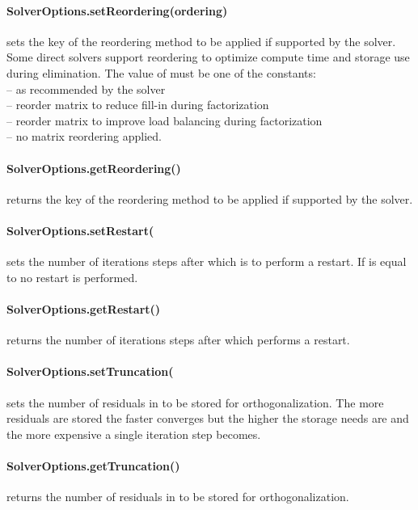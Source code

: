 \paragraph{SolverOptions.setReordering(ordering)}
sets the key of the reordering method to be applied if supported by the solver.
Some direct solvers support reordering to optimize compute time and storage
use during elimination. The value of  must be one of the
constants:\\
  -- as recommended by the solver\\
  -- reorder matrix to reduce fill-in during factorization\\
  -- reorder matrix to improve load balancing during factorization\\
  -- no matrix reordering applied.


\paragraph{SolverOptions.getReordering()}
returns the key of the reordering method to be applied if supported by the solver.


\paragraph{SolverOptions.setRestart(
}
sets the number of iterations steps after which \GMRES is to perform a restart.
If  is equal to  no restart is performed.


\paragraph{SolverOptions.getRestart()}
returns the number of iterations steps after which \GMRES performs a restart.


\paragraph{SolverOptions.setTruncation(
}
sets the number of residuals in \GMRES to be stored for orthogonalization. 
The more residuals are stored the faster \GMRES converges but the higher the storage needs are and the more expensive
a single iteration step becomes.


\paragraph{SolverOptions.getTruncation()}
returns the number of residuals in \GMRES to be stored for orthogonalization.



